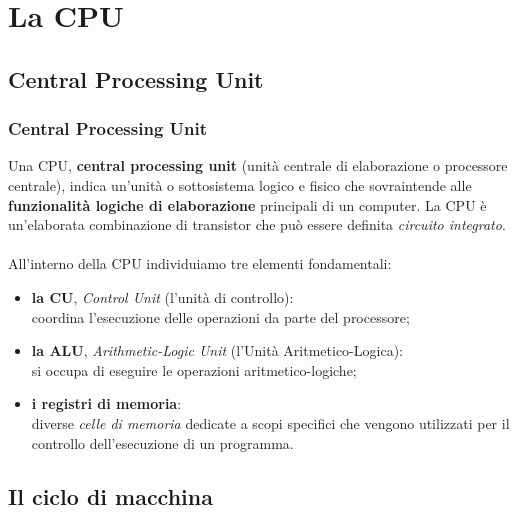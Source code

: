 \section[La CPU]{La CPU}
\label{sec:cpu}


\subsection[Central Processing Unit]{Central Processing Unit}
\begin{frame}
	\frametitle{Central Processing Unit}
	
		Una CPU, \textbf{central processing unit} (unità centrale di elaborazione o processore centrale), indica un'unità o sottosistema logico e fisico che sovraintende alle \textbf{funzionalità logiche di elaborazione} principali di un computer.
		La CPU è un'elaborata combinazione di transistor che può essere definita \textit{circuito integrato}.\\~\\
		\pause
		All'interno della CPU individuiamo tre elementi fondamentali:
		\begin{itemize}
			\item \textbf{la CU}, \textit{Control Unit} (l’unità di controllo):\\
			coordina l'esecuzione delle operazioni da parte del processore;
			\item \textbf{la ALU}, \textit{Arithmetic-Logic Unit} (l’Unità Aritmetico-Logica):\\
			si occupa di eseguire le operazioni aritmetico-logiche;
			\item \textbf{i registri di memoria}:\\
			diverse \textit{celle di memoria} dedicate a scopi specifici che vengono utilizzati per il controllo dell'esecuzione di un programma.
		\end{itemize}
	
\end{frame}



\subsection[Il ciclo di macchina]{Il ciclo di macchina}

